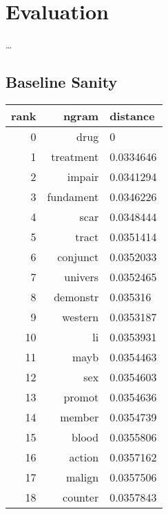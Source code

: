 \chapter{Evaluation}
\label{ch:evaluation}

\dots



\section{Baseline Sanity}
\label{sec:evaluation:baseline}

\begin{table}[ht]
    \begin{subtable}[t]{.45\textwidth}
        \centering
        \begin{tabularx}{\textwidth}{r R l}
            \toprule
            rank & ngram & distance\\
            \midrule
            \num{0} & drug & \num{0}\\
            \num{1} & treatment & \num{0.0334646}\\
            \num{2} & impair & \num{0.0341294}\\
            \num{3} & fundament & \num{0.0346226}\\
            \num{4} & scar & \num{0.0348444}\\
            \num{5} & tract & \num{0.0351414}\\
            \num{6} & conjunct & \num{0.0352033}\\
            \num{7} & univers & \num{0.0352465}\\
            \num{8} & demonstr & \num{0.035316}\\
            \num{9} & western & \num{0.0353187}\\
            \num{10} & li & \num{0.0353931}\\
            \num{11} & mayb & \num{0.0354463}\\
            \num{12} & sex & \num{0.0354603}\\
            \num{13} & promot & \num{0.0354636}\\
            \midrule
            \num{14} & member & \num{0.0354739}\\
            \num{15} & blood & \num{0.0355806}\\
            \num{16} & action & \num{0.0357162}\\
            \num{17} & malign & \num{0.0357506}\\
            \num{18} & counter & \num{0.0357843}\\

\end{tabularx}
\end{subtable}
\end{table}
